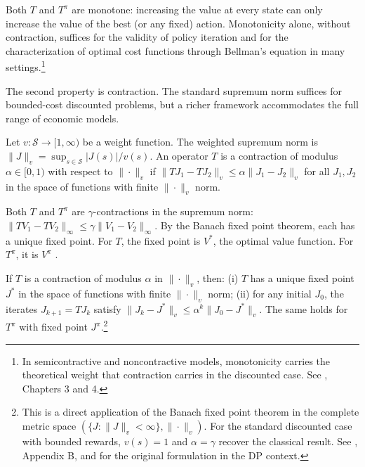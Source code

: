Both $T$ and $T^\pi$ are monotone: increasing the value at every state can only increase the value of the best (or any fixed) action. Monotonicity alone, without contraction, suffices for the validity of policy iteration and for the characterization of optimal cost functions through Bellman's equation in many settings.\footnote{In semicontractive and noncontractive models, monotonicity carries the theoretical weight that contraction carries in the discounted case. See \citet{bertsekas2022}, Chapters 3 and 4.}

The second property is contraction. The standard supremum norm suffices for bounded-cost discounted problems, but a richer framework accommodates the full range of economic models.

\begin{definition}
\label{def:weighted_contraction}
Let $v: \mathcal{S} \to [1, \infty)$ be a weight function. The weighted supremum norm is $\|J\|_v = \sup_{s \in \mathcal{S}} |J(s)| / v(s)$. An operator $T$ is a contraction of modulus $\alpha \in [0,1)$ with respect to $\|\cdot\|_v$ if $\|TJ_1 - TJ_2\|_v \leq \alpha \|J_1 - J_2\|_v$ for all $J_1, J_2$ in the space of functions with finite $\|\cdot\|_v$ norm.
\end{definition}

Both $T$ and $T^\pi$ are $\gamma$-contractions in the supremum norm: $\|TV_1 - TV_2\|_\infty \leq \gamma \|V_1 - V_2\|_\infty$. By the Banach fixed point theorem, each has a unique fixed point. For $T$, the fixed point is $V^*$, the optimal value function. For $T^\pi$, it is $V^\pi$ \citep{bertsekas1996}.

\begin{theorem}
\label{thm:geometric_convergence}
If $T$ is a contraction of modulus $\alpha$ in $\|\cdot\|_v$, then: (i) $T$ has a unique fixed point $J^*$ in the space of functions with finite $\|\cdot\|_v$ norm; (ii) for any initial $J_0$, the iterates $J_{k+1} = TJ_k$ satisfy $\|J_k - J^*\|_v \leq \alpha^k \|J_0 - J^*\|_v$. The same holds for $T^\pi$ with fixed point $J^\pi$.\footnote{This is a direct application of the Banach fixed point theorem in the complete metric space $(\{J : \|J\|_v < \infty\}, \|\cdot\|_v)$. For the standard discounted case with bounded rewards, $v(s) = 1$ and $\alpha = \gamma$ recover the classical result. See \citet{bertsekas2022}, Appendix B, and \citet{denardo1967} for the original formulation in the DP context.}
\end{theorem}

